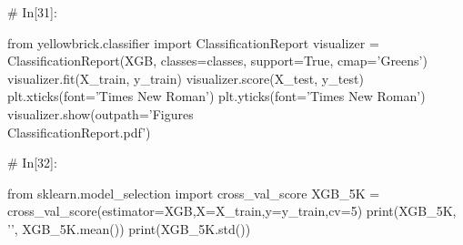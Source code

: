 \documentclass{MathorCupModeling}
\begin{document}
\begin{python}
# In[31]:


from yellowbrick.classifier import ClassificationReport
visualizer = ClassificationReport(XGB, classes=classes, support=True, cmap='Greens')
visualizer.fit(X_train, y_train)
visualizer.score(X_test, y_test)
plt.xticks(font='Times New Roman')
plt.yticks(font='Times New Roman')
visualizer.show(outpath='Figures\\ClassificationReport.pdf')


# In[32]:


from sklearn.model_selection import cross_val_score
XGB_5K = cross_val_score(estimator=XGB,X=X_train,y=y_train,cv=5)
print(XGB_5K, '\n', XGB_5K.mean())
print(XGB_5K.std())


\end{python}
\end{document}
